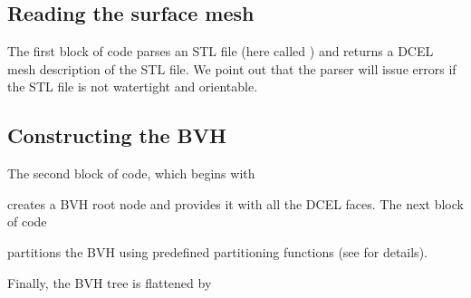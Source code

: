 \documentclass[letterpaper,10pt,english]{sphinxmanual}
\begin{document}
\subsection{Reading the surface mesh}
\label{\detokenize{Example_Basic:reading-the-surface-mesh}}
\sphinxAtStartPar
The first block of code parses an STL file (here called ) and returns a DCEL mesh description of the STL file.
We point out that the parser will issue errors if the STL file is not watertight and orientable.


\subsection{Constructing the BVH}
\label{\detokenize{Example_Basic:constructing-the-bvh}}
\sphinxAtStartPar
The second block of code, which begins with

\begin{sphinxVerbatim}[commandchars=\\\{\}]
\end{sphinxVerbatim}

\sphinxAtStartPar
creates a BVH root node and provides it with all the DCEL faces.
The next block of code

\begin{sphinxVerbatim}[commandchars=\\\{\}]
      

         
         
\end{sphinxVerbatim}

\sphinxAtStartPar
partitions the BVH using pre\sphinxhyphen{}defined partitioning functions (see {\hyperref[\detokenize{ImplemDCEL:chap-bvhintegration}]{}} for details).

\sphinxAtStartPar
Finally, the BVH tree is flattened by

\begin{sphinxVerbatim}[commandchars=\\\{\}]

\end{sphinxVerbatim}
\end{document}
